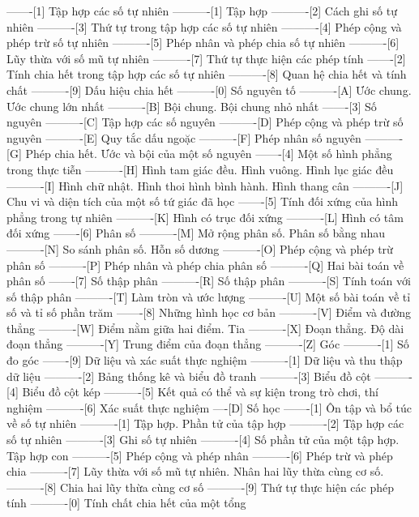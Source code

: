 -------[1] Tập hợp các số tự nhiên
----------[1] Tập hợp
----------[2] Cách ghi số tự nhiên
----------[3] Thứ tự trong tập hợp các số tự nhiên
----------[4] Phép cộng và phép trừ số tự nhiên
----------[5] Phép nhân và phép chia số tự nhiên
----------[6] Lũy thừa với số mũ tự nhiên
----------[7] Thứ tự thực hiện các phép tính
-------[2] Tính chia hết trong tập hợp các số tự nhiên
----------[8] Quan hệ chia hết và tính chất
----------[9] Dấu hiệu chia hết
----------[0] Số nguyên tố
----------[A] Ước chung. Ước chung lớn nhất
----------[B] Bội chung. Bội chung nhỏ nhất
-------[3] Số nguyên
----------[C] Tập hợp các số nguyên
----------[D] Phép cộng và phép trừ số nguyên
----------[E] Quy tắc dấu ngoặc
----------[F] Phép nhân số nguyên
----------[G] Phép chia hết. Ước và bội của một số nguyên
-------[4] Một số hình phẳng trong thực tiễn
----------[H] Hình tam giác đều. Hình vuông. Hình lục giác đều
----------[I] Hình chữ nhật. Hình thoi hình bình hành. Hình thang cân
----------[J] Chu vi và diện tích của một số tứ giác đã học
-------[5] Tính đối xứng của hình phẳng trong tự nhiên
----------[K] Hình có trục đối xứng
----------[L] Hình có tâm đối xứng
-------[6] Phân số
----------[M] Mở rộng phân số. Phân số bằng nhau
----------[N] So sánh phân số. Hỗn số dương
----------[O] Phép cộng và phép trừ phân số
----------[P] Phép nhân và phép chia phân số
----------[Q] Hai bài toán về phân số
-------[7] Số thập phân
----------[R] Số thập phân
----------[S] Tính toán với số thập phân
----------[T] Làm tròn và ước lượng
----------[U] Một số bài toán về tỉ số và tỉ số phần trăm
-------[8] Những hình học cơ bản
----------[V] Điểm và đường thẳng
----------[W] Điểm nằm giữa hai điểm. Tia
----------[X] Đoạn thẳng. Độ dài đoạn thẳng
----------[Y] Trung điểm của đoạn thẳng
----------[Z] Góc
----------[1] Số đo góc
-------[9] Dữ liệu và xác suất thực nghiệm
----------[1] Dữ liệu và thu thập dữ liệu
----------[2] Bảng thống kê và biểu đồ tranh
----------[3] Biểu đồ cột
----------[4] Biểu đồ cột kép
----------[5] Kết quả có thể và sự kiện trong trò chơi, thí nghiệm
----------[6] Xác suất thực nghiệm
----[D] Số học
-------[1] Ôn tập và bổ túc về số tự nhiên
----------[1] Tập hợp. Phần tử của tập hợp
----------[2] Tập hợp các số tự nhiên
----------[3] Ghi số tự nhiên
----------[4] Số phần tử của một tập hợp. Tập hợp con
----------[5] Phép cộng và phép nhân
----------[6] Phép trừ và phép chia
----------[7] Lũy thừa với số mũ tự nhiên. Nhân hai lũy thừa cùng cơ số.
----------[8] Chia hai lũy thừa cùng cơ số
----------[9] Thứ tự thực hiện các phép tính
----------[0] Tính chất chia hết của một tổng
